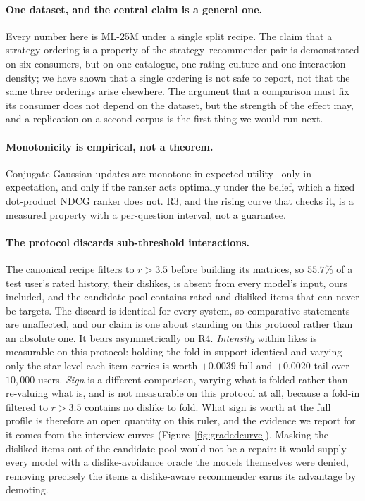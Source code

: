 \documentclass[acmsmall,review,anonymous]{acmart}
\begin{document}
\paragraph{One dataset, and the central claim is a general one.} Every number here is ML-25M under a single split recipe. The claim that a strategy ordering is a property of the strategy--recommender pair is demonstrated on six consumers, but on one catalogue, one rating culture and one interaction density; we have shown that a single ordering is not safe to report, not that the same three orderings arise elsewhere. The argument that a comparison must fix its consumer does not depend on the dataset, but the strength of the effect may, and a replication on a second corpus is the first thing we would run next.

\paragraph{Monotonicity is empirical, not a theorem.} Conjugate-Gaussian updates are monotone in expected utility~\citep{good1967principle,blackwell1953equivalent} only in expectation, and only if the ranker acts optimally under the belief, which a fixed dot-product NDCG ranker does not. R3, and the rising curve that checks it, is a measured property with a per-question interval, not a guarantee.

\paragraph{The protocol discards sub-threshold interactions.} The canonical recipe filters to $r>3.5$ before building its matrices, so $55.7\%$ of a test user's rated history, their dislikes, is absent from every model's input, ours included, and the candidate pool contains rated-and-disliked items that can never be targets. The discard is identical for every system, so comparative statements are unaffected, and our claim is one about standing on this protocol rather than an absolute one. It bears asymmetrically on R4. \emph{Intensity} within likes is measurable on this protocol: holding the fold-in support identical and varying only the star level each item carries is worth $+0.0039$ full and $+0.0020$ tail over $10{,}000$ users. \emph{Sign} is a different comparison, varying what is folded rather than re-valuing what is, and is not measurable on this protocol at all, because a fold-in filtered to $r>3.5$ contains no dislike to fold. What sign is worth at the full profile is therefore an open quantity on this ruler, and the evidence we report for it comes from the interview curves (Figure~\ref{fig:gradedcurve}). Masking the disliked items out of the candidate pool would not be a repair: it would supply every model with a dislike-avoidance oracle the models themselves were denied, removing precisely the items a dislike-aware recommender earns its advantage by demoting.
\end{document}
